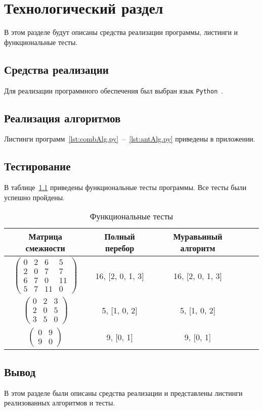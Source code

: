 \chapter{Технологический раздел}
В этом разделе будут описаны средства реализации программы, листинги и функциональные тесты.

\section{Средства реализации}
Для реализации программного обеспечения был выбран язык \texttt{Python}~\cite{PythonBook}.
	
\section{Реализация алгоритмов}
Листинги  программ~\ref{lst:combAlg.py}~--~\ref{lst:antAlg.py} приведены в приложении.

\section{Тестирование}
В таблице~\ref{t:func_t} приведены функциональные тесты программы. 
Все тесты были успешно пройдены.
\begin{center}
	\captionsetup{justification=raggedright,singlelinecheck=off}
	\begin{longtable}[c]{|c|c|c|c|c|}
		\caption{Функциональные тесты\label{t:func_t}} \\ \hline
		Матрица смежности & Полный перебор & Муравьиный алгоритм \\
		\hline
		$ \begin{pmatrix}
		 0 &  2  & 6 &  5\\
		2  & 0  & 7  & 7\\
		6  & 7 &  0 & 11\\
		5  & 7 & 11 &  0
		
		\end{pmatrix}$ &
		16, [2, 0, 1, 3] &
		16, [2, 0, 1, 3] \\
		
		$ \begin{pmatrix}
			0 & 2 & 3 \\
			2 & 0 & 5 \\
			3 & 5 & 0	
		\end{pmatrix}$ &
		5, [1, 0, 2] &
		5, [1, 0, 2] \\
		
		$ \begin{pmatrix}
		 0 & 9\\
		 9 & 0
		\end{pmatrix}$ &
		9, [0, 1] &
		9, [0, 1] \\
		\hline
	\end{longtable}
\end{center}
	
\section*{Вывод}
В этом разделе были описаны средства реализации и представлены листинги реализованных алгоритмов и тесты.